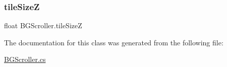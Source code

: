\mbox{\label{class_b_g_scroller_aa59f8685bd548c55d50c8396ae28ff2f}} 
\subsubsection{\texorpdfstring{tile\+SizeZ}{tileSizeZ}}
{\footnotesize\ttfamily float B\+G\+Scroller.\+tile\+SizeZ}



The documentation for this class was generated from the following file\+:\begin{DoxyCompactItemize}
\item 
\mbox{\hyperlink{_b_g_scroller_8cs}{B\+G\+Scroller.\+cs}}\end{DoxyCompactItemize}

